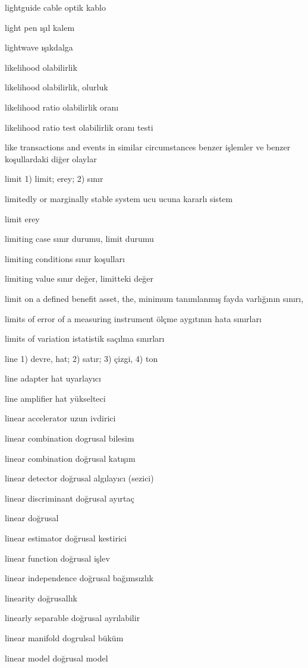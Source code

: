 \documentclass[12pt,fleqn]{article}\usepackage{../../common}
\begin{document}
lightguide cable optik kablo

light pen ışıl kalem

lightwave ışıkdalga

likelihood olabilirlik

likelihood olabilirlik, olurluk

likelihood ratio olabilirlik oranı

likelihood ratio test olabilirlik oranı testi

like transactions and events in similar circumstances benzer işlemler ve benzer koşullardaki diğer olaylar

limit 1) limit; erey; 2) sınır

limitedly or marginally stable system ucu ucuna kararlı sistem

limit erey

limiting case sınır durumu, limit durumu

limiting conditions sınır koşulları

limiting value sınır değer, limitteki değer

limit on a defined benefit asset, the, minimum tanımlanmış fayda varlığının sınırı,

limits of error of a measuring instrument ölçme aygıtının hata sınırları

limits of variation istatistik saçılma sınırları

line 1) devre, hat; 2) satır; 3) çizgi, 4) ton

line adapter hat uyarlayıcı

line amplifier hat yükselteci

linear accelerator uzun ivdirici

linear combination dogrusal bilesim

linear combination doğrusal katışım

linear detector doğrusal algılayıcı (sezici)

linear discriminant doğrusal ayırtaç

linear doğrusal

linear estimator doğrusal kestirici

linear function doğrusal işlev

linear independence doğrusal bağımsızlık

linearity doğrusallık

linearly separable doğrusal ayrılabilir

linear manifold dogrulsal büküm

linear model doğrusal model
\end{document}
